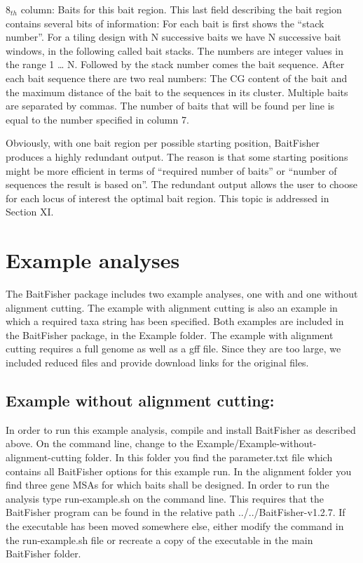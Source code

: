 \documentclass[a4paper,pdflatex,11pt]{article}
\begin{document}
$8_{th}$ column: Baits for this bait region. This last
field describing the bait region contains several bits of information:
For each bait is first shows the ``stack number''. For a tiling design
with N successive baits we have N successive bait windows, in the
following called bait stacks. The numbers are integer values in the
range 1 \ldots{} N. Followed by the stack number comes the bait
sequence. After each bait sequence there are two real numbers:
The CG content of the bait and the maximum distance of the bait to the
sequences in its cluster. Multiple baits are separated by commas. The
number of baits that will be found per line is equal to the number
specified in column 7.

Obviously, with one bait region per possible starting position,
BaitFisher produces a highly redundant output. The reason is that some
starting positions might be more efficient in terms of ``required number
of baits'' or ``number of sequences the result is based on''. The
redundant output allows the user to choose for each locus of interest
the optimal bait region. This topic is addressed in Section XI.

\section{Example analyses}

The BaitFisher package includes two example analyses, one with and one
without alignment cutting. 
The example with alignment cutting is also an example in which a required taxa string
has been specified.
Both examples are included in the BaitFisher package, in the
Example folder. The example with
alignment cutting requires a full genome as well as a gff file.
Since they are too large, we included reduced files and provide download links for the
original files.

\subsection{Example without alignment cutting:}

In order to run this example analysis, compile and install BaitFisher as described above.
On the command line, change to the
Example/Example-without-alignment-cutting folder. In this folder you
find the parameter.txt file which contains all BaitFisher options for
this example run. In the alignment folder you find three gene MSAs for
which baits shall be designed.
In order to run the analysis type
run-example.sh on the command line.
This requires that the BaitFisher program can be found in the relative path
../../BaitFisher-v1.2.7. If the executable has been moved somewhere else, either modify the
command in the run-example.sh file or recreate a copy of the executable in the main BaitFisher folder.
\end{document}
